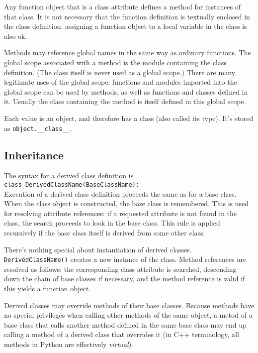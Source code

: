 Any function object that is a class attribute
defines a method for instances of that class.
It is not necessary that the function definition
is textually enclosed in the class definition:
assigning a function object to a local variable in the class is also ok.

Methods may reference global names in the same way as ordinary functions.
The global scope associated with a method
is the module containing the class definition.
(The class itself is never used as a global scope.)
There are many legitimate uses of the global scope:
functions and modules imported into the global scope can be used by methods,
as well as functions and classes defined in it.
Usually the class containing the method is itself defined in this global scope.

Each value is an object, and therefore has a class (also called its type).
It's stored as \verb=object.__class__=.


\subsection{Inheritance}

The syntax for a derived class definition is\\
\verb=class DerivedClassName(BaseClassName):=\\
Execution of a derived class definition proceeds the same as for a base class.
When the class object is constructed, the base class is remembered.
This is used for resolving attribute references:
if a requested attribute is not found in the class,
the search proceeds to look in the base class.
This rule is applied recursively
if the base class itself is derived from some other class.

There's nothing special about instantiation of derived classes.\\
\verb=DerivedClassName()= creates a new instance of the class.
Method references are resolved as follows:
the corresponding class attribute is searched,
descending down the chain of base classes if necessary,
and the method reference is valid if this yields a function object.

Derived classes may override methods of their base classes.
Because methods have no special privileges
when calling other methods of the same object,
a metod of a base class
that calls another method defined in the same base class
may end up calling a method of a derived class that overrides it
(in C++ terminology, all methods in Python are effectively \emph{virtual}).

